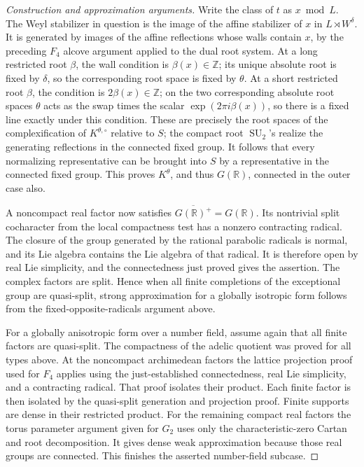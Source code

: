 \documentclass[11pt,a4paper,openany,oneside]{book}
\theoremstyle{resultstyle}
\theoremstyle{definition}
\numberwithin{equation}{chapter}
\begin{document}
\begin{proof}[Construction and approximation arguments]
Write the class of \(t\) as \(x\bmod L\). The Weyl stabilizer
in question is the image of the affine stabilizer of \(x\)
in \(L\rtimes W^\delta\). It is generated by images of the
affine reflections whose walls contain \(x\), by the preceding
\(F_4\) alcove argument applied to the dual root system.
At a long restricted root \(\beta\), the wall condition is
\(\beta(x)\in\mathbb Z\); its unique absolute root is fixed by
\(\delta\), so the corresponding root space is fixed by
\(\theta\). At a short restricted root \(\beta\), the condition
is \(2\beta(x)\in\mathbb Z\); on the two corresponding absolute
root spaces \(\theta\) acts as the swap times the scalar
\(\exp(2\pi i\beta(x))\), so there is a fixed line exactly
under this condition. These are precisely the root spaces
of the complexification of \(K^{\theta,\circ}\) relative
to \(S\); the compact root \(\operatorname{SU}_2\)'s realize
the generating reflections in the connected fixed group.
It follows that every normalizing representative can be
brought into \(S\) by a representative in the connected fixed
group. This proves \(K^\theta\), and thus \(G(\mathbb R)\),
connected in the outer case also.

A noncompact real factor now satisfies
\(\overline{G(\mathbb R)^+}=G(\mathbb R)\). Its nontrivial
split cocharacter from the local compactness test has a
nonzero contracting radical. The closure of the group
generated by the rational parabolic radicals is normal,
and its Lie algebra contains the Lie algebra of that
radical. It is therefore open by real Lie simplicity, and
the connectedness just proved gives the assertion. The
complex factors are split. Hence when all finite
completions of the exceptional group are quasi-split,
strong approximation for a globally isotropic form
follows from the fixed-opposite-radicals argument above.

For a globally anisotropic form over a number field,
assume again that all finite factors are quasi-split.
The compactness of the adelic quotient was proved for all
types above. At the noncompact archimedean factors the lattice
projection proof used for \(F_4\) applies using the just-established
connectedness, real Lie simplicity, and a contracting radical.
That proof isolates their product. Each finite factor is
then isolated by the quasi-split generation and projection
proof. Finite supports are dense in their restricted product.
For the remaining compact real factors the torus
parameter argument given for \(G_2\) uses only the
characteristic-zero Cartan and root decomposition.
It gives dense weak approximation because those real
groups are connected. This finishes the asserted
number-field subcase.


\end{proof}
\end{document}
